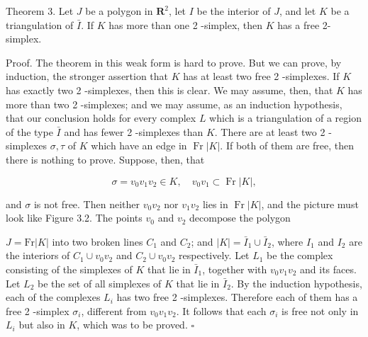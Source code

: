 Theorem 3. Let $J$ be a polygon in $\mathbf{R}^{2}$, let $I$ be the interior of $J$, and let $K$ be a triangulation of $\bar{I}$. If $K$ has more than one 2 -simplex, then $K$ has a free 2-simplex.

Proof. The theorem in this weak form is hard to prove. But we can prove, by induction, the stronger assertion that $K$ has at least two free 2 -simplexes. If $K$ has exactly two 2 -simplexes, then this is clear. We may assume, then, that $K$ has more than two 2 -simplexes; and we may assume, as an induction hypothesis, that our conclusion holds for every complex $L$ which is a triangulation of a region of the type $\bar{I}$ and has fewer 2 -simplexes than $K$. There are at least two 2 -simplexes $\sigma, \tau$ of $K$ which have an edge in $\operatorname{Fr}|K|$. If both of them are free, then there is nothing to prove. Suppose, then, that

$$
\sigma=v_{0} v_{1} v_{2} \in K, \quad v_{0} v_{1} \subset \operatorname{Fr}|K|,
$$

and $\sigma$ is not free. Then neither $v_{0} v_{2}$ nor $v_{1} v_{2}$ lies in $\operatorname{Fr}|K|$, and the picture must look like Figure 3.2. The points $v_{0}$ and $v_{2}$ decompose the polygon

\begin{center}
\end{center}


$J=\mathrm{Fr}|K|$ into two broken lines $C_{1}$ and $C_{2}$; and $|K|=\bar{I}_{1} \cup \bar{I}_{2}$, where $I_{1}$ and $I_{2}$ are the interiors of $C_{1} \cup v_{0} v_{2}$ and $C_{2} \cup v_{0} v_{2}$ respectively. Let $L_{1}$ be the complex consisting of the simplexes of $K$ that lie in $\bar{I}_{1}$, together with $v_{0} v_{1} v_{2}$ and its faces. Let $L_{2}$ be the set of all simplexes of $K$ that lie in $\bar{I}_{2}$. By the induction hypothesis, each of the complexes $L_{i}$ has two free 2 -simplexes. Therefore each of them has a free 2 -simplex $\sigma_{i}$, different from $v_{0} v_{1} v_{2}$. It follows that each $\sigma_{i}$ is free not only in $L_{i}$ but also in $K$, which was to be proved. \(\square\)
